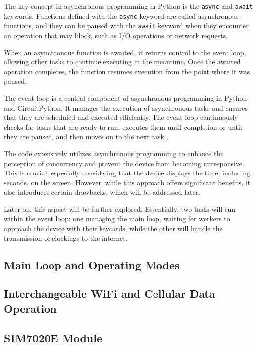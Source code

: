 The key concept in asynchronous programming in Python is the \texttt{async} and \texttt{await} 
keywords. Functions defined with the \texttt{async} keyword are called asynchronous functions, and 
they can be paused with the \texttt{await} keyword when they encounter an operation that may block, 
such as I/O operations or network requests.

When an asynchronous function is awaited, it returns control to the event loop, allowing other 
tasks to continue executing in the meantime. Once the awaited operation completes, the function 
resumes execution from the point where it was paused.

The event loop is a central component of asynchronous programming in Python and CircuitPython. It 
manages the execution of asynchronous tasks and ensures that they are scheduled and executed 
efficiently. The event loop continuously checks for tasks that are ready to run, executes them 
until completion or until they are paused, and then moves on to the next task 
\cite{circuitpython_docs}.

The code extensively utilizes asynchronous programming to enhance the perception of concurrency 
and prevent the device from becoming unresponsive. This is crucial, especially considering that the 
device displays the time, including seconds, on the screen. However, while this approach offers 
significant benefits, it also introduces certain drawbacks, which will be addressed later.

Later on, this aspect will be further explored. Essentially, two tasks will run within the event 
loop: one managing the main loop, waiting for workers to approach the device with their keycards, 
while the other will handle the transmission of clockings to the internet.

\subsection{Main Loop and Operating Modes}



\subsection{Interchangeable WiFi and Cellular Data Operation}

\subsection{SIM7020E Module}

